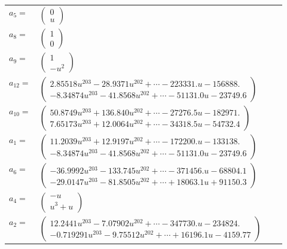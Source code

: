 \documentclass[1p]{elsarticle_modified}
\theoremstyle{definition}
\begin{document}
\begin{tabular}{m{7pt} m{180pt} m{7pt} m{180pt} }
\flushright $a_{5}=$&$\begin{pmatrix}0\\u\end{pmatrix}$ \\
\flushright $a_{8}=$&$\begin{pmatrix}1\\0\end{pmatrix}$ \\
\flushright $a_{9}=$&$\begin{pmatrix}1\\- u^2\end{pmatrix}$ \\
\flushright $a_{12}=$&$\begin{pmatrix}2.85518 u^{203}-28.9371 u^{202}+\cdots-223331. u-156888.\\-8.34874 u^{203}-41.8568 u^{202}+\cdots-51131.0 u-23749.6\end{pmatrix}$ \\
\flushright $a_{10}=$&$\begin{pmatrix}50.8749 u^{203}+136.840 u^{202}+\cdots-27276.5 u-182971.\\7.65173 u^{203}+12.0064 u^{202}+\cdots-34318.5 u-54732.4\end{pmatrix}$ \\
\flushright $a_{1}=$&$\begin{pmatrix}11.2039 u^{203}+12.9197 u^{202}+\cdots-172200. u-133138.\\-8.34874 u^{203}-41.8568 u^{202}+\cdots-51131.0 u-23749.6\end{pmatrix}$ \\
\flushright $a_{6}=$&$\begin{pmatrix}-36.9992 u^{203}-133.745 u^{202}+\cdots-371456. u-68804.1\\-29.0147 u^{203}-81.8505 u^{202}+\cdots+18063.1 u+91150.3\end{pmatrix}$ \\
\flushright $a_{4}=$&$\begin{pmatrix}- u\\u^3+u\end{pmatrix}$ \\
\flushright $a_{2}=$&$\begin{pmatrix}12.2441 u^{203}-7.07902 u^{202}+\cdots-347730. u-234824.\\-0.719291 u^{203}-9.75512 u^{202}+\cdots+16196.1 u-4159.77\end{pmatrix}$ \\

\end{tabular}
\end{document}
